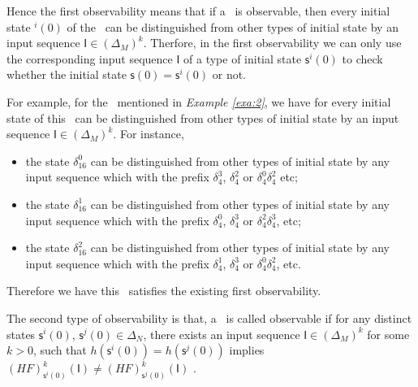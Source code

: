 Hence the first observability means that if a \BCN\ is observable, then every initial state \State$^{i}(0)$ of the \BCN\ can be distinguished from other types of initial state by an input sequence $\mathsf{I}\in(\Delta_M)^k$. Therfore, in the first observability we can only use the corresponding input sequence $\mathsf{I}$ of a type of initial state $\mathsf{s}^{i}(0)$ to check whether the initial state $\mathsf{s}(0)=\mathsf{s}^{i}(0)$ or not. 
\begin{example}
For example, for the \BCN\ mentioned in {\em Example \ref{exa:2}}, we have for every initial state of this \BCN\ can be distinguished from other types of initial state by an input sequence $\mathsf{I}\in(\Delta_M)^k$.  For instance,
\begin{itemize}
  \item the state $\delta_{16}^0$ can be distinguished from other types of initial state by any input sequence which with the prefix $\delta_{4}^3$, $\delta_{4}^2$ or $\delta_{4}^0  \delta_{4}^2$  etc;
  \item the state $\delta_{16}^1$ can be distinguished from other types of initial state by any input sequence which with the prefix $\delta_{4}^0$, $\delta_{4}^3$ or $\delta_{4}^2 \delta_{4}^3$, etc;
  \item the state $\delta_{16}^2$ can be distinguished from other types of initial state by any input sequence which with the prefix $\delta_{4}^1$, $\delta_{4}^3$ or $\delta_{4}^0 \delta_{4}^2$, etc.
\end{itemize} 

Therefore we have this \BCN\ satisfies the existing first observability.
\label{exa:4}
\end{example}   

\begin{definition}
	The second type of observability is that, a \BCN\ is called observable if for any distinct states $\mathsf{s}^{i}(0)$, $\mathsf{s}^{j}(0) \in \Delta_N$, there exists an input sequence $\mathsf{I}\in(\Delta_M)^k$ for some $k>0$, such that $h(\mathsf{s}^{i}(0))=h(\mathsf{s}^{j}(0))$ implies $(HF)^k_{\mathsf{s}^{i}(0)}(\mathsf{I})\neq (HF)^k_{\mathsf{s}^{j}(0)}(\mathsf{I})$ \cite{Zhao2010Input}.
\end{definition}

